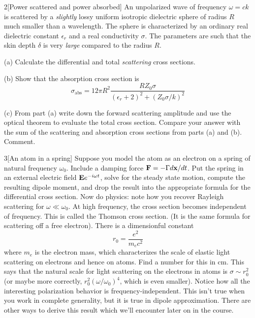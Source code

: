 \documentclass[12pt]{article}
\begin{document}
\begin{problem}{2}[Power scattered and power absorbed]
An unpolarized wave of frequency $\omega=ck$ is scattered by a \textit{slightly}
lossy uniform isotropic dielectric sphere of radius $R$ much smaller than a
wavelength. The sphere is characterized by an ordinary real dielectric constant
$\epsilon_r$ and a real conductivity $\sigma$. The parameters are such that the
skin depth $\delta$ is very \textit{large} compared to the radius $R$.

(a) Calculate the differential and total \textit{scattering} cross sections.

(b) Show that the absorption cross section is
\begin{equation}
    \sigma_\text{abs}=12\pi
    R^2\frac{RZ_0\sigma}{(\epsilon_r+2)^2+(Z_0\sigma/k)^2} 
\end{equation}

(c) From part (a) write down the forward scattering amplitude and use the
optical theorem to evaluate the total cross section. Compare your answer with
the sum of the scattering and absorption cross sections from parts (a) and (b).
Comment.
\begin{solution}
\end{solution}
\end{problem}
\newpage
\begin{problem}{3}[An atom in a spring]
Suppose you model the atom as an electron on a spring of natural frequency
$\omega_0$. Include a damping force $\vb{F}=-\Gamma d\vb{x}/dt$. Put the spring
in an external electric field $\vb{E}e^{-i\omega t}$, solve for the steady state
motion, compute the resulting dipole moment, and drop the result into the
appropriate formula for the differential cross section. Now do physics: note how
you recover Rayleigh scattering for $\omega\ll\omega_0$. At high frequency, the
cross section becomes independent of frequency. This is called the Thomson cross
section. (It is the same formula for scattering off a free electron). There is a
dimensionful constant
\begin{equation}
    r_0=\frac{e^2}{m_ec^2} 
\end{equation}
where $m_e$ is the electron mass, which characterizes the scale of elastic light
scattering on electrons and hence on atoms. Find a number for this in cm. This
says that the natural scale for light scattering on the electrons in atoms is
$\sigma\sim r_0^2$ (or maybe more correctly, $r_0^2(\omega/\omega_0)^4$, which
is even smaller). Notice how all the interesting polarization behavior is
frequency-independent. This isn't true when you work in complete generality, but
it is true in dipole approximation. There are other ways to derive this result
which we'll encounter later on in the course.
\begin{solution}
\end{solution}
\end{problem}
\newpage
\end{document}
